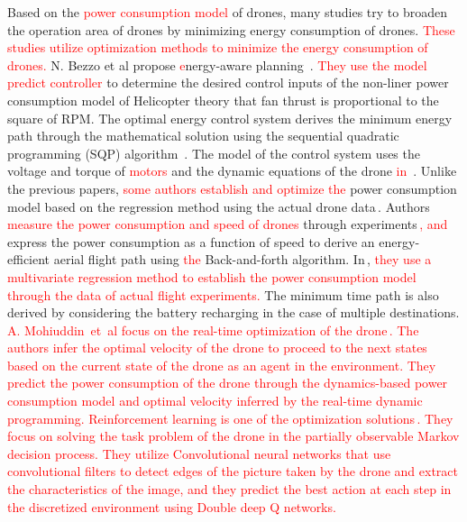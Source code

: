 \documentclass[journal]{./template/IEEEtran}
\begin{document}
Based on the \textcolor{red}{power consumption model} of drones, many studies try to broaden the operation area of drones by minimizing energy consumption of drones. 
\textcolor{red}{These studies utilize optimization methods to minimize the energy consumption of drones.}
N. Bezzo et al propose \textcolor{red}{e}nergy-aware planning~\cite{ref_5}. 
\textcolor{red}{They use the model predict controller} to determine the desired control inputs of the non-liner power consumption model of Helicopter theory that fan thrust is proportional to the square of RPM.
The optimal energy control system derives the minimum energy path through the mathematical solution using the sequential quadratic programming (SQP) algorithm~\cite{ref_6}. 
The model of the control system uses the voltage and torque of \textcolor{red}{motors} and the dynamic equations of the drone \textcolor{red}{in~\cite{ref_6}}. 
Unlike the previous papers, \textcolor{red}{some authors establish and optimize the} power consumption model based on the regression method using the actual drone data\textcolor{red}{\,\cite{ref_8,ref_9}}.
Authors \textcolor{red}{measure the power consumption and speed of drones} through experiments\,\cite{ref_8}\textcolor{red}{, and} express the power consumption as a function of speed to derive an energy-efficient aerial flight path using \textcolor{red}{the} Back-and-forth algorithm.
In\,\cite{ref_9}, \textcolor{red}{they use a multivariate regression method to establish the power consumption model through the data of actual flight experiments.}
The minimum time path is also derived by considering the battery recharging in the case of multiple destinations.
\textcolor{red}{A. Mohiuddin~et~al focus on the real-time optimization of the drone\,\cite{ref_23}. 
The authors infer the optimal velocity of the drone to proceed to the next states based on the current state of the drone as an agent in the environment.
They predict the power consumption of the drone through the dynamics-based power consumption model and optimal velocity inferred by the real-time dynamic programming.
Reinforcement learning is one of the optimization solutions\,\cite{ref_25}.
They focus on solving the task problem of the drone in the partially observable Markov decision process. 
They utilize Convolutional neural networks that use convolutional filters to detect edges of the picture taken by the drone and extract the characteristics of the image, and they predict the best action at each step in the discretized environment using Double deep Q networks.}
\end{document}
